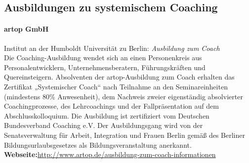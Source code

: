 \documentclass[11pt,a4paper]{article}
\begin{document}
\newpage

\subsection*{\textsf{Ausbildungen zu systemischem Coaching}}



\paragraph{\textsf{artop GmbH}} Institut an der Humboldt Universität zu Berlin: \textsl{Ausbildung zum Coach}\\
Die Coaching-Ausbildung wendet sich an einen Personenkreis aus Personalentwicklern, Unternehmensberatern, Führungskräften und Quereinsteigern. Absolventen der artop-Ausbildung zum Coach erhalten das Zertifikat „Systemischer Coach“ nach Teilnahme an den Seminareinheiten (mindestens 80\% Anwesenheit), dem Nachweis zweier eigenständig absolvierter Coachingprozesse, des Lehrcoachings und der Fallpräsentation auf dem Abschlusskolloquium. Die Ausbildung ist zertifiziert vom Deutschen Bundesverband Coaching e.V. Der Ausbildungsgang wird von der Senatsverwaltung für Arbeit, Integration und Frauen Berlin gemäß des Berliner Bildungsurlaubsgesetzes als Bildungsveranstaltung anerkannt.\\
\textbf{Webseite:}\textsf{\textcolor{MidnightBlue}{\url{http://www.artop.de/ausbildung-zum-coach-informationen}}}
\end{document}
